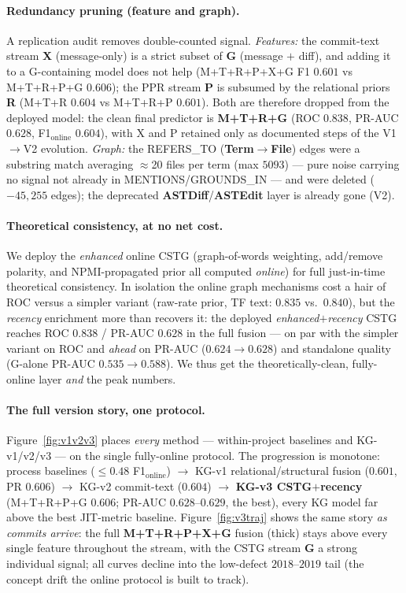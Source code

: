 \documentclass[11pt,a4paper]{article}
\newcommand{\node}[1]{\textcolor{kgblue}{\textbf{#1}}}
\newcommand{\edge}[1]{\textsc{#1}}
\begin{document}
	\paragraph{Redundancy pruning (feature and graph).} A replication audit removes
	double-counted signal. \emph{Features:} the commit-text stream \textbf{X}
	(message-only) is a strict subset of \textbf{G} (message $+$ diff), and adding it to
	a G-containing model does not help (M+T+R+P+X+G F1 $0.601$ vs M+T+R+P+G $0.606$);
	the PPR stream \textbf{P} is subsumed by the relational priors \textbf{R} (M+T+R
	$0.604$ vs M+T+R+P $0.601$). Both are therefore dropped from the deployed model: the
	clean final predictor is \textbf{M+T+R+G} (ROC $0.838$, PR-AUC $0.628$,
	F1$_{\mathrm{online}}$ $0.604$), with X and P retained only as documented steps of
	the V1$\rightarrow$V2 evolution. \emph{Graph:} the \edge{REFERS\_TO}
	(\node{Term}$\rightarrow$\node{File}) edges were a substring match averaging
	$\approx$20 files per term (max $5093$) --- pure noise carrying no signal not already
	in \edge{MENTIONS}/\edge{GROUNDS\_IN} --- and were deleted ($-45{,}255$ edges);
	the deprecated \node{ASTDiff}/\node{ASTEdit} layer is already gone (V2).

	\paragraph{Theoretical consistency, at no net cost.} We deploy the \emph{enhanced}
	online CSTG (graph-of-words weighting, add/remove polarity, and NPMI-propagated prior
	all computed \emph{online}) for full just-in-time theoretical consistency. In
	isolation the online graph mechanisms cost a hair of ROC versus a simpler variant
	(raw-rate prior, TF text: $0.835$ vs.\ $0.840$), but the \emph{recency} enrichment
	more than recovers it: the deployed \emph{enhanced$+$recency} CSTG reaches ROC
	$0.838$ / PR-AUC $0.628$ in the full fusion --- on par with the simpler variant on
	ROC and \emph{ahead} on PR-AUC ($0.624\!\rightarrow\!0.628$) and standalone quality
	(G-alone PR-AUC $0.535\!\rightarrow\!0.588$). We thus get the theoretically-clean,
	fully-online layer \emph{and} the peak numbers.

	\paragraph{The full version story, one protocol.} Figure~\ref{fig:v1v2v3} places
	\emph{every} method --- within-project baselines and KG-v1/v2/v3 --- on the single
	fully-online protocol. The progression is monotone: process baselines
	($\le0.48$ F1$_{\mathrm{online}}$) $\rightarrow$ KG-v1 relational/structural fusion
	($0.601$, PR $0.606$) $\rightarrow$ KG-v2 commit-text ($0.604$) $\rightarrow$
	\textbf{KG-v3 CSTG$+$recency} (M+T+R+P+G $0.606$; PR-AUC $0.628$--$0.629$, the best),
	every KG model far above the best JIT-metric baseline. Figure~\ref{fig:v3traj} shows the same story
	\emph{as commits arrive}: the full \textbf{M+T+R+P+X+G} fusion (thick) stays above
	every single feature throughout the stream, with the CSTG stream \textbf{G} a strong
	individual signal; all curves decline into the low-defect $2018$--$2019$ tail
	(the concept drift the online protocol is built to track).
\end{document}
